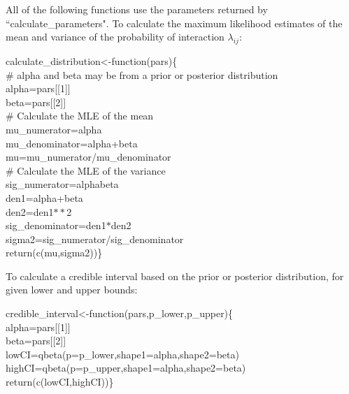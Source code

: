 \documentclass[12pt]{article}
\begin{document}
    All of the following functions use the parameters returned by 
    ``calculate\_parameters". To calculate the maximum likelihood estimates of 
    the mean and variance of the probability of interaction $\lambda_{ij}$:

    \vspace{12pt}
    \begin{em}
    \noindent \hspace{2pt}calculate\_distribution\textless-function(pars)\{\\
     \vspace{4pt}
     \# alpha and beta may be from a prior or posterior distribution\\
      alpha=pars[[1]]\\
      beta=pars[[2]]\\
      \vspace{4pt}
      \# Calculate the MLE of the mean\\
      mu\_numerator=alpha\\
      mu\_denominator=alpha+beta\\
      mu=mu\_numerator/mu\_denominator\\
      \vspace{4pt}
      \# Calculate the MLE of the variance\\
      sig\_numerator=alpha\*beta\\
      den1=alpha+beta\\
      den2=den1$**$2\\
      sig\_denominator=den1$*$den2\\
      sigma2=sig\_numerator/sig\_denominator\\
      return(c(mu,sigma2))\}
    \end{em}
  \vspace{12pt}
      
  \clearpage

  To calculate a credible interval based on the prior or posterior distribution, for given lower and upper bounds:


  \vspace{12pt}
  \begin{em}
  \noindent \hspace{2pt}credible\_interval\textless-function(pars,p\_lower,p\_upper)\{\\
    \vspace{4pt}
    alpha=pars[[1]]\\
    beta=pars[[2]]\\
    lowCI=qbeta(p=p\_lower,shape1=alpha,shape2=beta)\\
    highCI=qbeta(p=p\_upper,shape1=alpha,shape2=beta)\\
    return(c(lowCI,highCI))\}
  \end{em}
  \vspace{12pt}
\end{document}

